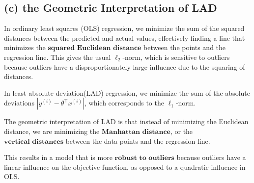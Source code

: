 \documentclass[12pt]{article}
\begin{document}
\subsection*{(c) the Geometric Interpretation of LAD}

In ordinary least squares (OLS) regression, we minimize the sum of the squared distances between the predicted and actual values, effectively finding a line that minimizes the \(\textbf{squared Euclidean distance}\) between the points and the regression line. This gives the usual \( \ell_2 \)-norm, which is sensitive to outliers because outliers have a disproportionately large influence due to the squaring of distances.

In least absolute deviation(LAD) regression, we minimize the sum of the absolute deviations \( |y^{(i)} - \theta^\top x^{(i)}| \), which corresponds to the \( \ell_1 \)-norm.

The geometric interpretation of LAD is that instead of minimizing the Euclidean distance, we are minimizing the \(\textbf{Manhattan distance}\), or the \(\textbf{vertical distances}\) between the data points and the regression line. 

This results in a model that is more \(\textbf{robust to outliers}\) because outliers have a linear influence on the objective function, as opposed to a quadratic influence in OLS.


\newpage
\end{document}
